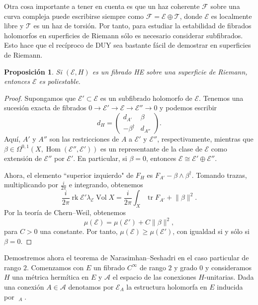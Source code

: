 \documentclass[12pt, a4paper]{amsart}
\newcommand\Aa{\mathcal{A}}
\newcommand\FF{\mathscr{F}}
\newcommand\EE{\mathscr{E}}
\DeclareMathOperator\tr{tr}
\DeclareMathOperator\rk{rk}
\DeclareMathOperator\Vol{Vol}
\DeclareMathOperator\Hom{Hom}
\DeclareMathOperator\delbar{\bar{\partial}}
\newtheorem{prop}[thm]{Proposición}
\theoremstyle{remark} \newtheorem{rmk}[thm]{Observación}
\theoremstyle{remark} \newtheorem{rmks}[thm]{Observaciones}
\theoremstyle{definition} \newtheorem{defn}[thm]{Definición}
\theoremstyle{definition} \newtheorem{ejs}[thm]{Ejemplos}
\theoremstyle{definition} \newtheorem{ej}[thm]{Ejemplo}
\begin{document}
Otra cosa importante a tener en cuenta es que un haz coherente $\FF$ sobre una curva compleja puede escribirse siempre como $\FF=\EE \oplus \mathscr{T}$, donde $\EE$ es localmente libre y $\mathscr{T}$ es un haz de torsión. Por tanto, para estudiar la estabilidad de fibrados holomorfos en superficies de Riemann sólo es necesario considerar subfibrados. Esto hace que el recíproco de DUY sea bastante fácil de demostrar en superficies de Riemann.

\begin{prop}
	Si $(\EE,H)$ es un fibrado HE sobre una superficie de Riemann, entonces $\EE$ es poliestable. 
\end{prop}
\begin{proof}
	Supongamos que $\EE'\subset \EE$ es un subfibrado holomorfo de $\EE$. Tenemos una sucesión exacta de fibrados $0\rightarrow \EE'\rightarrow \EE \rightarrow \EE'' \rightarrow 0$ y podemos escribir
	\begin{equation*}
	d_{H}=
	\begin{pmatrix}
		d_{A'} & \beta \\
		-\beta^\dagger & d_{A''}
	\end{pmatrix}.
	\end{equation*} 
	Aquí, $A'$ y $A''$ son las restricciones de $A$ a $\EE'$ y $\EE''$, respectivamente, mientras que $\beta \in \Omega^{0,1}(X,\Hom(\EE'',\EE'))$ es un representante de la clase de $\EE$ como extensión de $\EE''$ por $\EE'$. En particular, si $\beta=0$, entonces $\EE\cong \EE'\oplus \EE''$.

	Ahora, el elemento ``superior izquierdo"  de $F_H$ es  $F_{A'}-\beta\wedge \beta^\dagger$. Tomando trazas, multiplicando por $\tfrac{i}{2\pi}$ e integrando, obtenemos
	\begin{equation*}
		\frac{i}{2\pi} \rk \EE' \lambda_\EE \Vol X = \frac{i}{2\pi} \int_X \tr F_{A'} + \lVert \beta \rVert^2.
	\end{equation*} 
	Por la teoría de Chern--Weil, obtenemos
	\begin{equation*}
		\mu(\EE) = \mu(\EE') + C\lVert \beta \rVert^2,
	\end{equation*} 
	para $C>0$ una constante. Por tanto, $\mu(\EE)\geq \mu(\EE')$, con igualdad si y sólo si $\beta=0$.
\end{proof}

Demostremos ahora el teorema de Narasimhan--Seshadri en el caso particular de rango $2$. Comenzamos con $E$ un fibrado $C^\infty$ de rango $2$ y grado $0$ y consideramos $H$ una métrica hermítica en $E$ y $\Aa$ el espacio de las conexiones $H$-unitarias. Dada una conexión $A\in \Aa$ denotamos por $\EE_A$ la estructura holomorfa en $E$ inducida por $\delbar_A$.
\end{document}
